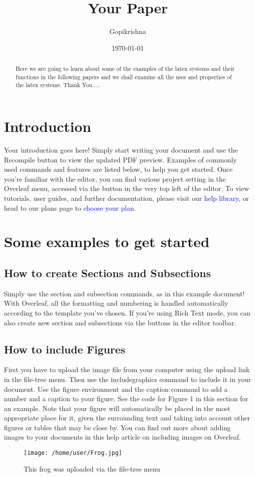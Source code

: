 \documentclass{article}
\title{Your Paper}
\author{Gopikrishna}
\date{\today}
\begin{document}
\maketitle
\begin{abstract}
	Here we are going to learn about some of the examples of the latex systems and their functions in the following papers and we shall examine all the uses and properties of the latex systems.
       \newline
	    Thank You.....
\end{abstract}
\section{Introduction}
Your introduction goes here! Simply start writing your document and use the Recompile button to
view the updated PDF preview. Examples of commonly used commands and features are listed below,
to help you get started.
Once you’re familiar with the editor, you can find various project setting in the Overleaf menu,
accessed via the button in the very top left of the editor. To view tutorials, user guides, and further
documentation, please visit our \textcolor{blue}{help library}, or head to our plans page to \textcolor{blue}{choose your plan}.
\section{Some examples to get started}
\subsection{How to create Sections and Subsections}
Simply use the section and subsection commands, as in this example document! With Overleaf, all
the formatting and numbering is handled automatically according to the template you’ve chosen. If
you’re using Rich Text mode, you can also create new section and subsections via the buttons in the
editor toolbar.
\subsection{How to include Figures}
First you have to upload the image file from your computer using the upload link in the file-tree menu.
Then use the includegraphics command to include it in your document. Use the figure environment
and the caption command to add a number and a caption to your figure. See the code for Figure 1 in
this section for an example.
Note that your figure will automatically be placed in the most appropriate place for it, given the
surrounding text and taking into account other figures or tables that may be close by. You can find
out more about adding images to your documents in this help article on including images on Overleaf.
\begin{figure}[htbp]
	\centering
 	\texttt{[image: /home/user/Frog.jpg]}
	\caption{This frog was uploaded via the file-tree menu}\label{figure 1:This frog was uploaded via the file-tree menu}
\end{figure}
\end{document}
